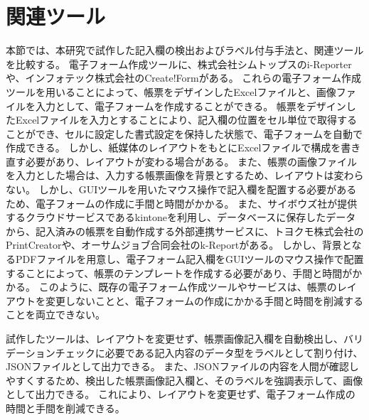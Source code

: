 




\section{関連ツール}\label{sec:relation_tools}
本節では、本研究で試作した記入欄の検出およびラベル付与手法と、関連ツールを比較する。
電子フォーム作成ツールに、株式会社シムトップスのi-Reporter\cite{i-Reporter}や、インフォテック株式会社のCreate!Form\cite{Create!Form}がある。
これらの電子フォーム作成ツールを用いることによって、帳票をデザインしたExcelファイルと、画像ファイルを入力として、電子フォームを作成することができる。
帳票をデザインしたExcelファイルを入力とすることにより、記入欄の位置をセル単位で取得することができ、セルに設定した書式設定を保持した状態で、電子フォームを自動で作成できる。
しかし、紙媒体のレイアウトをもとにExcelファイルで構成を書き直す必要があり、レイアウトが変わる場合がある。
また、帳票の画像ファイルを入力とした場合は、入力する帳票画像を背景とするため、レイアウトは変わらない。
しかし、GUIツールを用いたマウス操作で記入欄を配置する必要があるため、電子フォームの作成に手間と時間がかかる。
また、サイボウズ社が提供するクラウドサービスであるkintone\cite{kintone}を利用し、データベースに保存したデータから、記入済みの帳票を自動作成する外部連携サービスに、トヨクモ株式会社のPrintCreator\cite{PrintCreator}や、オーサムジョブ合同会社のk-Report\cite{k-Report}がある。
しかし、背景となるPDFファイルを用意し、電子フォーム記入欄をGUIツールのマウス操作で配置することによって、帳票のテンプレートを作成する必要があり、手間と時間がかかる。
このように、既存の電子フォーム作成ツールやサービスは、帳票のレイアウトを変更しないことと、電子フォームの作成にかかる手間と時間を削減することを両立できない。

試作したツールは、レイアウトを変更せず、帳票画像記入欄を自動検出し、バリデーションチェックに必要である記入内容のデータ型をラベルとして割り付け、JSONファイルとして出力できる。
また、JSONファイルの内容を人間が確認しやすくするため、検出した帳票画像記入欄と、そのラベルを強調表示して、画像として出力できる。
これにより、レイアウトを変更せず、電子フォーム作成の時間と手間を削減できる。

